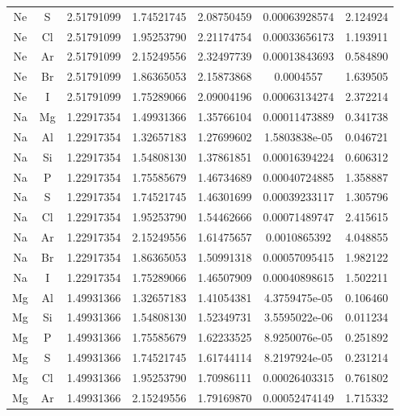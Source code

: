 \begin{longtable}{@{}ccccccc@{}}
Ne &  S     &     2.51791099   &   1.74521745  &    2.08750459 &  0.00063928574  &  2.124924\\
Ne &  Cl    &     2.51791099   &   1.95253790  &    2.21174754 &  0.00033656173  &  1.193911\\
Ne &  Ar    &     2.51791099   &   2.15249556  &    2.32497739 &  0.00013843693  &  0.584890\\
Ne &  Br    &     2.51791099   &   1.86365053  &    2.15873868 &      0.0004557  &  1.639505\\
Ne &  I     &     2.51791099   &   1.75289066  &    2.09004196 &  0.00063134274  &  2.372214\\
Na &  Mg    &     1.22917354   &   1.49931366  &    1.35766104 &  0.00011473889  &  0.341738\\
Na &  Al    &     1.22917354   &   1.32657183  &    1.27699602 &  1.5803838e-05  &  0.046721\\
Na &  Si    &     1.22917354   &   1.54808130  &    1.37861851 &  0.00016394224  &  0.606312\\
Na &  P     &     1.22917354   &   1.75585679  &    1.46734689 &  0.00040724885  &  1.358887\\
Na &  S     &     1.22917354   &   1.74521745  &    1.46301699 &  0.00039233117  &  1.305796\\
Na &  Cl    &     1.22917354   &   1.95253790  &    1.54462666 &  0.00071489747  &  2.415615\\
Na &  Ar    &     1.22917354   &   2.15249556  &    1.61475657 &   0.0010865392  &  4.048855\\
Na &  Br    &     1.22917354   &   1.86365053  &    1.50991318 &  0.00057095415  &  1.982122\\
Na &  I     &     1.22917354   &   1.75289066  &    1.46507909 &  0.00040898615  &  1.502211\\
Mg &  Al    &     1.49931366   &   1.32657183  &    1.41054381 &  4.3759475e-05  &  0.106460\\
Mg &  Si    &     1.49931366   &   1.54808130  &    1.52349731 &  3.5595022e-06  &  0.011234\\
Mg &  P     &     1.49931366   &   1.75585679  &    1.62233525 &  8.9250076e-05  &  0.251892\\
Mg &  S     &     1.49931366   &   1.74521745  &    1.61744114 &  8.2197924e-05  &  0.231214\\
Mg &  Cl    &     1.49931366   &   1.95253790  &    1.70986111 &  0.00026403315  &  0.761802\\
Mg &  Ar    &     1.49931366   &   2.15249556  &    1.79169870 &  0.00052474149  &  1.715332\\

\end{longtable}
